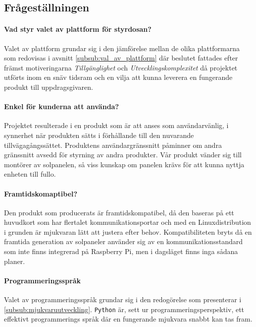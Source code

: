 \documentclass{article}
\begin{document}
        \subsection{Frågeställningen} %
        \label{sub:fragestallningen}
            \paragraph{\textrm{Vad styr valet av plattform för styrdosan?}} %
            \label{par:vad_styr_valet}
                Valet av plattform grundar sig i den jämförelse mellan de olika plattformarna som redovisas i avsnitt \ref{subsub:val_av_plattform} där beslutet fattades efter främst motiveringarna \emph{Tillgänglighet} och \emph{Utvecklingskomplexitet} då projektet utförts inom en snäv tidsram och en vilja att kunna leverera en fungerande produkt till uppdragsgivaren. 

            \paragraph{\textrm{Enkel för kunderna att använda?}} %
            \label{par:enk}
                Projektet resulterade i en produkt som är att anses som användarvänlig, i synnerhet när produkten sätts i förhållande till den nu\-varande tillväga\-gångs\-sättet. Produktens användar\-gräns\-snitt påminner om andra gränssnitt avsedd för styrning av andra produkter. Vår produkt vänder sig till montörer av solpanelen, så viss kunskap om panelen krävs för att kunna nyttja enheten till fullo.

            \paragraph{\textrm{Framtidskomaptibel?}} %
            \label{par:framtidskomaptibel}
                Den produkt som producerats är framtidskompatibel, då den baseras på ett huvudkort som har flertalet kommunikationsportar och med en Linux\-distribution i grunden är mjukvaran lätt att justera efter behov. Kompatibiliteten bryts då en framtida generation av solpaneler använder sig av en kommunikationsstandard som inte finns integrerad på Raspberry Pi, men i dagsläget finns inga sådana planer.

            \paragraph{\textrm{Programmeringsspråk}} %
            \label{par:programmeringssprak}
               Valet av programmeringsspråk grundar sig i den redogörelse som presenterar i \ref{subsub:mjukvaruutveckling}. \texttt{Python} är, sett ur programmeringsperspektiv, ett effektivt programmerings språk där en fungerande mjukvara snabbt kan tas fram.
        
\end{document}
